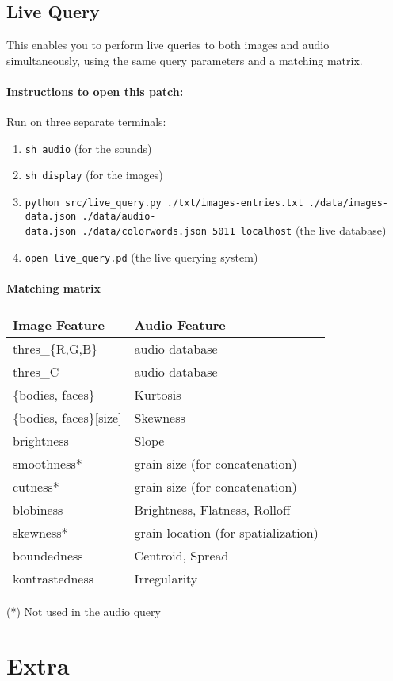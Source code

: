 \subsection{Live Query}

This enables you to perform live queries to both images and audio simultaneously, using the same query parameters and a matching matrix.


\paragraph{Instructions to open this patch:}

Run on three separate terminals:

\begin{enumerate}
\item \texttt{sh\ audio} (for the sounds)
\item \texttt{sh\ display} (for the images)
\item \texttt{python\ src/live\_query.py\ ./txt/images-entries.txt\ ./data/images-data.json\ ./data/audio-data.json\ ./data/colorwords.json\ 5011\ localhost} (the live database)
\item \texttt{open live\_query.pd} (the live querying system)
\end{enumerate}


\paragraph{Matching matrix}

\begin{longtable}[]{@{}ll@{}}
\toprule
Image Feature & Audio Feature\tabularnewline
\midrule
\endhead
thres\_\{R,G,B\} & audio database\tabularnewline
thres\_C & audio database\tabularnewline
\{bodies, faces\} & Kurtosis\tabularnewline
\{bodies, faces\}{[}size{]} & Skewness\tabularnewline
brightness & Slope\tabularnewline
smoothness* & grain size (for concatenation)\tabularnewline
cutness* & grain size (for concatenation)\tabularnewline
blobiness & Brightness, Flatness, Rolloff\tabularnewline
skewness* & grain location (for spatialization)\tabularnewline
boundedness & Centroid, Spread\tabularnewline
kontrastedness & Irregularity\tabularnewline
\bottomrule
\end{longtable}

(*) Not used in the audio query


\section{Extra}


